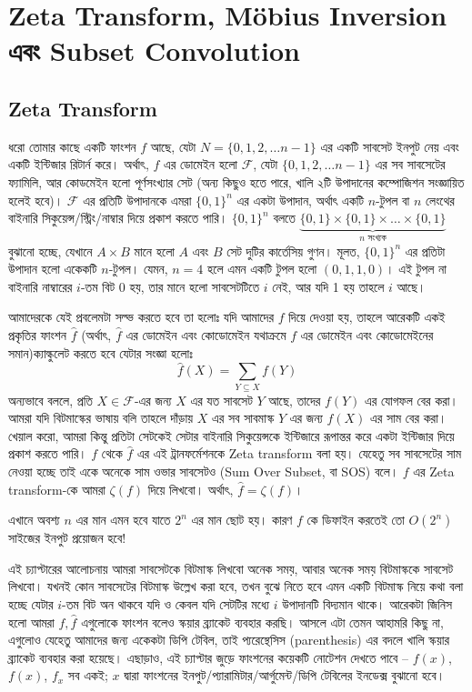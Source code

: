 \chapter{Zeta Transform, M{\"o}bius Inversion এবং Subset Convolution}
\begingroup
\renewcommand{\one}[1]{(#1)}

\section{Zeta Transform}

ধরো তোমার কাছে একটি ফাংশন $f$ আছে, যেটা $N = \{0, 1, 2, \ldots
n-1\}$ এর একটি
সাবসেট ইনপুট নেয় এবং একটি ইন্টিজার রিটার্ন করে। অর্থাৎ, $f$ এর ডোমেইন হলো
$\mathcal{F}$, যেটা $\{0, 1, 2, \ldots n-1\}$ এর সব সাবসেটের ফ্যামিলি, আর
কোডমেইন হলো পূর্ণসংখ্যার সেট (অন্য কিছুও হতে পারে, খালি ২টি উপাদানের
কম্পোজিশন সংজ্ঞায়িত হলেই হবে)। $\mathcal{F}$ এর প্রতিটি উপাদানকে এমরা $\{0,
1\}^n$ এর একটা উপাদান, অর্থাৎ একটি $n$-টুপল বা $n$ লেংথের বাইনারি
সিকুয়েন্স/স্ট্রিং/নাম্বার দিয়ে প্রকাশ করতে পারি। $\{0,1\}^n$ বলতে
$\underbrace{\{0,1\} \times \{0,1\} \times
\dots \times \{0,1\}}_{\text{$n$ সংখ্যক}}$ বুঝানো হচ্ছে, যেখানে $A \times B$
মানে হলো $A$ এবং $B$ সেট দুটির কার্তেসিয় গুণন। মূলত, $\{0,1\}^n$ এর প্রতিটা
উপাদান হলো একেকটি $n$-টুপল। যেমন, $n=4$ হলে এমন একটি টুপল হলো $\left(0, 1,
1, 0 \right)$। এই টুপল না বাইনারি নাম্বারের $i$-তম বিট
0 হয়, তার মানে হলো সাবসেটটিতে $i$ নেই, আর যদি 1 হয় তাহলে $i$ আছে।

আমাদেরকে যেই প্রবলেমটা সল্ভ করতে হবে তা হলোঃ যদি আমাদের $f$ দিয়ে দেওয়া হয়,
তাহলে আরেকটি একই প্রকৃতির ফাংশন $\hat{f}$ (অর্থাৎ, $\hat{f}$ এর ডোমেইন এবং
কোডোমেইন যথাক্রমে $f$ এর ডোমেইন এবং কোডোমেইনের সমান)ক্যাল্কুলেট করতে হবে
যেটার সংজ্ঞা হলোঃ
\[
  \hat{f}\one{X} = \sum_{Y \subseteq X} f\one{Y}
\]
অন্যভাবে বললে, প্রতি $X \in \mathcal{F}$-এর জন্য $X$ এর যত সাবসেট $Y$ আছে,
তাদের
$f\one{Y}$ এর যোগফল বের করা। আমরা যদি বিটমাস্কের ভাষায় বলি তাহলে দাঁড়ায় $X$
এর সব সাবমাস্ক $Y$ এর জন্য $f\one{X}$ এর সাম বের করা। খেয়াল করো, আমরা কিন্তু
প্রতিটা সেটকেই সেটার বাইনারি সিকুয়েন্সকে ইন্টিজারে রূপান্তর করে একটা ইন্টিজার
দিয়ে প্রকাশ করতে পারি। $f$ থেকে $\hat{f}$ এর এই ট্রানফর্মেশনকে Zeta transform
বলা হয়। যেহেতু সব সাবসেটের সাম নেওয়া হচ্ছে তাই একে অনেকে সাম ওভার
সাবসেটও (Sum Over Subset, বা SOS) বলে। $f$ এর Zeta transform-কে আমরা
$\zeta(f)$ দিয়ে লিখবো। অর্থাৎ, $\hat{f} = \zeta(f)$।

এখানে অবশ্য $n$ এর মান এমন হবে যাতে $2^n$ এর মান ছোট হয়। কারণ $f$ কে ডিফাইন
করতেই তো $O(2^n)$ সাইজের ইনপুট প্রয়োজন হবে!

এই চ্যাপ্টারের আলোচনায় আমরা সাবসেটকে বিটমাস্ক লিখবো অনেক সময়, আবার অনেক সময়
বিটমাস্ককে সাবসেট লিখবো। যখনই কোন সাবসেটের বিটমাস্ক উল্লেখ করা হবে, তখন বুঝে
নিতে হবে এমন একটি বিটমাস্ক নিয়ে কথা বলা হচ্ছে যেটার $i$-তম বিট অন থাকবে যদি ও
কেবল যদি সেটটির মধ্যে $i$ উপাদানটি বিদ্যমান থাকে। আরেকটা জিনিস হলো আমরা $f,
\hat{f}$ এগুলোকে ফাংশন বলেও স্কয়ার ব্র্যাকেট ব্যবহার করছি। আসলে এটা তেমন
আহামরি কিছু না, এগুলোও যেহেতু আমাদের জন্য একেকটা ডিপি টেবিল, তাই প্যরেন্থেসিস
(parenthesis) এর বদলে খালি স্কয়ার ব্র্যাকেট ব্যবহার করা হয়েছে। এছাড়াও, এই
চ্যাপ্টার জুড়ে ফাংশনের কয়েকটি নোটেশন দেখতে পাবে -- $f(x)$, $f\one{x}$, $f_x$
সব একই; $x$ দ্বারা ফাংশনের ইনপুট/প্যারামিটার/আর্গুমেন্ট/ডিপি টেবিলের ইনডেক্স
বুঝানো হবে।

